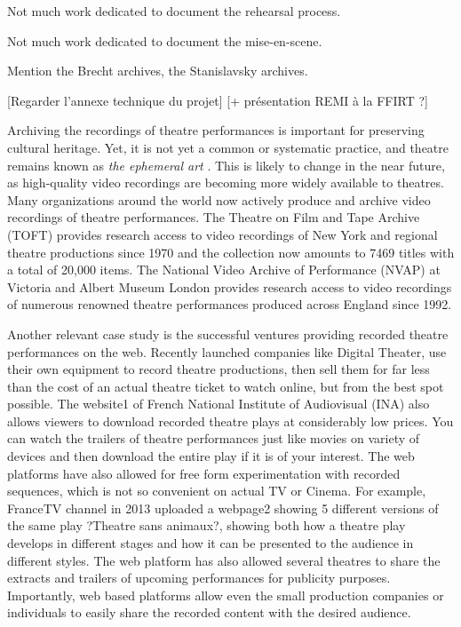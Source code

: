 \documentclass[conference]{IEEEtran}
\begin{document}
Not much work dedicated to document the rehearsal process.

Not much work dedicated to document the mise-en-scene.

Mention the Brecht archives, the Stanislavsky archives.

[Regarder l'annexe technique du projet]
[+ présentation REMI à la FFIRT ?]

Archiving the recordings of theatre performances is important for preserving  cultural heritage. 
Yet, it is not yet a common or systematic practice, and theatre remains known as {\em the ephemeral art} \cite{}.
This is likely to change in the near future, as high-quality video recordings are becoming more widely
available to theatres.   Many organizations around the world now actively produce and
archive video recordings of theatre performances. The Theatre on Film and Tape Archive
(TOFT) provides research access to video recordings of New York and regional theatre productions
since 1970 and the collection now amounts to 7469 titles with a total of 20,000 items. 
The National Video Archive of Performance (NVAP) at Victoria and Albert Museum London
provides research access to video recordings of numerous renowned theatre performances produced
across England since 1992. 

Another relevant case study  is the successful ventures providing recorded
theatre performances on the web. Recently launched companies like Digital Theater, use their
own equipment to record theatre productions, then sell them for far less than the cost of an
actual theatre ticket to watch online, but from the best spot possible. The website1 of French
National Institute of Audiovisual (INA) also allows viewers to download recorded theatre plays
at considerably low prices. You can watch the trailers of theatre performances just like movies
on variety of devices and then download the entire play if it is of your interest. The web platforms
have also allowed for free form experimentation with recorded sequences, which is not
so convenient on actual TV or Cinema. For example, FranceTV channel in 2013 uploaded a
webpage2 showing 5 different versions of the same play ?Theatre sans animaux?, showing both
how a theatre play develops in different stages and how it can be presented to the audience in
different styles. The web platform has also allowed several theatres to share the extracts and
trailers of upcoming performances for publicity purposes. Importantly, web based platforms
allow even the small production companies or individuals to easily share the recorded content
with the desired audience.
\end{document}
